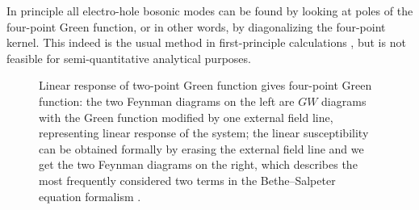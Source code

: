 \documentclass[hyperref, a4paper]{article}
\begin{document}
In principle all electro-hole bosonic modes can be found by 
looking at poles of the four-point Green function,
or in other words, 
by diagonalizing the four-point kernel.
This indeed is the usual method in first-principle calculations 
\cite{berkeleygw},
but is not feasible for semi-quantitative analytical purposes. 

\begin{figure}
    \centering
    
    \caption{Linear response of two-point Green function gives four-point Green function: 
    the two Feynman diagrams on the left are $GW$ diagrams with the Green function 
    modified by one external field line, 
    representing linear response of the system;
    the linear susceptibility can be obtained 
    formally by erasing the external field line 
    and we get the two Feynman diagrams on the right,
    which describes the most frequently considered 
    two terms in the Bethe–Salpeter equation formalism \cite{berkeleygw}.}
    \label{fig:two-point-response}
\end{figure}
\end{document}
